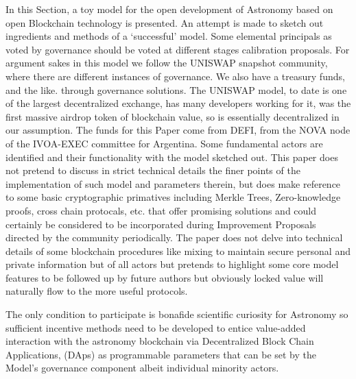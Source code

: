 \documentclass[final,5p,times,twocolumn,authoryear]{elsarticle}
\begin{document}
In this Section, a toy model for the open development of Astronomy based on open Blockchain technology is presented. An attempt is made to sketch out ingredients and methods of a `successful' model. Some elemental principals as voted by governance should be voted at different stages calibration proposals. For argument sakes in this model we follow the UNISWAP snapshot community, where there are different instances of governance. We also have a treasury funds, and the like.  through governance solutions. The UNISWAP model, to date is one of the largest decentralized exchange, has many developers working for it, was the first massive airdrop token of blockchain value, so is essentially decentralized in our assumption. The funds for this Paper come from DEFI, from the NOVA node of the IVOA-EXEC committee for Argentina. Some fundamental actors are identified and their functionality with the model sketched out. This paper does not pretend to discuss in strict technical details the finer points of the implementation of such model and parameters therein, but does make reference to some basic cryptographic primatives including Merkle Trees, Zero-knowledge proofs, cross chain protocals, etc. that offer promising solutions and could certainly be considered to be incorporated during Improvement Proposals directed by the community periodically. The paper does not delve into technical details of some blockchain procedures like mixing to maintain secure personal and private information but of all actors but pretends to highlight some core model features to be followed up by future authors but obviously  locked value will naturally flow to the more useful protocols.  
 
The only condition to participate is bonafide scientific curiosity for Astronomy so sufficient incentive methods need to be developed to entice value-added interaction with the astronomy blockchain via Decentralized Block Chain Applications, (DAps) as programmable parameters that can be set by the Model's governance component albeit individual minority actors. 
\end{document}
